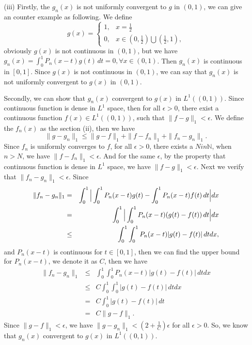 \documentclass[12pt,a4paper]{ctexart}
\begin{document}
(iii) Firstly, the $g_{n}(x)$ is not uniformly convergent to $g$ in $(0, 1)$, we can give an counter example as following. We define 
\begin{equation*}
g(x) =
\left\{
             \begin{array}{cl}
             1, & x = \frac{1}{2} \\
             0, & x \in (0, \frac{1}{2}) \bigcup (\frac{1}{2}, 1),
             \end{array}
\right.
\end{equation*}
obviously $g(x)$ is not continuous in $(0, 1)$, but we have $g_{n} (x) = \int_{0}^{1} P_{n}(x -t)g(t) \, d t = 0, \forall x \in (0, 1)$. Then $g_{n} (x)$ is continuous in $[0, 1]$. Since $g(x)$ is not continuous in $(0, 1)$, we can say that $g_{n}(x)$ is not uniformly convergent to $g(x)$ in $(0, 1)$.

Secondly, we can show that $g_{n}(x)$ convergent to $g(x)$ in $L^{1}((0, 1))$. Since continuous function is dense in $L^{1}$ space, then for all $\epsilon > 0$, there exist a continuous function $f(x) \in L^{1}((0, 1))$, such that $\|f- g \|_{1} < \epsilon$. We define the $f_{n}(x)$ as the section (ii), then we have
\begin{equation*}
\|g- g_{n} \|_{1} \leq  \|g- f \|_{1} + \|f- f_{n} \|_{1} + \|f_{n}- g_{n} \|_{1}.
\end{equation*}
Since $f_{n}$ is uniformly converges to $f$, for all $\epsilon > 0$, there exists a $N in \mathbb{N}$, when $n > N$, we have $\|f- f_{n} \|_{1} < \epsilon$. And for the same $\epsilon$, by the property that continuous function is dense in $L^{1}$ space, we have $\|f- g \|_{1} < \epsilon$. Next we verify that $\|f_{n}- g_{n} \|_{1} < \epsilon$. Since
\begin{eqnarray*}
\|f_{n}- g_{n} \|_{1} &=& \int_{0}^{1} \Big{|} \int_{0}^{1}  P_{n}(x-t) g(t) - \int_{0}^{1}  P_{n}(x-t) f(t) \, d t \Big{|} d x  \\
&=& \int_{0}^{1} \Big{|} \int_{0}^{1}  P_{n}(x-t) (g(t) - f(t)) \, d t \Big{|} d x  \\
&\leq& \int_{0}^{1}  \int_{0}^{1}  P_{n}(x-t) |g(t) - f(t)|\, d t  d x,
\end{eqnarray*}
and $P_{n}(x-t)$ is continuous for $t \in [0, 1]$, then we can find the upper bound for  $P_{n}(x-t)$, we denote it as $C$, then we have
\begin{eqnarray*}
\|f_{n}- g_{n} \|_{1} &\leq&  \int_{0}^{1}  \int_{0}^{1}  P_{n}(x-t) |g(t) - f(t)|\, d t  d x \\
&\leq&  C \int_{0}^{1}  \int_{0}^{1} |g(t) - f(t)|\, d t  d x \\
&=&  C \int_{0}^{1} |g(t) - f(t)|\, d t \\
&=& C \|g-f \|_{1}.
\end{eqnarray*}
Since $\|g-f \|_{1} < \epsilon$, we have $\|g-g_{n} \|_{1} < (2 + \frac{1}{C}) \epsilon$ for all $\epsilon > 0$. So, we know that $g_{n}(x)$ convergent to $g(x)$ in $L^{1}((0, 1))$.
\end{document}
